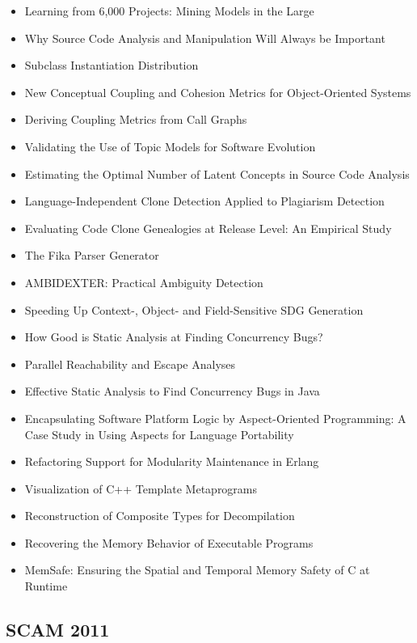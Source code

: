 {\small
\begin{itemize}[itemsep=-1ex]
  \item Learning from 6,000 Projects: Mining Models in the Large
  \item Why Source Code Analysis and Manipulation Will Always be Important
  \item Subclass Instantiation Distribution
  \item New Conceptual Coupling and Cohesion Metrics for Object-Oriented Systems
  \item Deriving Coupling Metrics from Call Graphs
  \item Validating the Use of Topic Models for Software Evolution
  \item Estimating the Optimal Number of Latent Concepts in Source Code Analysis
  \item Language-Independent Clone Detection Applied to Plagiarism Detection
  \item Evaluating Code Clone Genealogies at Release Level: An Empirical Study
  \item The Fika Parser Generator
  \item AMBIDEXTER: Practical Ambiguity Detection
  \item Speeding Up Context-, Object- and Field-Sensitive SDG Generation
  \item How Good is Static Analysis at Finding Concurrency Bugs?
  \item Parallel Reachability and Escape Analyses
  \item Effective Static Analysis to Find Concurrency Bugs in Java
  \item Encapsulating Software Platform Logic by Aspect-Oriented Programming: A Case Study in Using Aspects for Language Portability
  \item Refactoring Support for Modularity Maintenance in Erlang
  \item Visualization of C++ Template Metaprograms
  \item Reconstruction of Composite Types for Decompilation
  \item Recovering the Memory Behavior of Executable Programs
  \item MemSafe: Ensuring the Spatial and Temporal Memory Safety of C at Runtime
\end{itemize}
}

\subsection{SCAM 2011}

